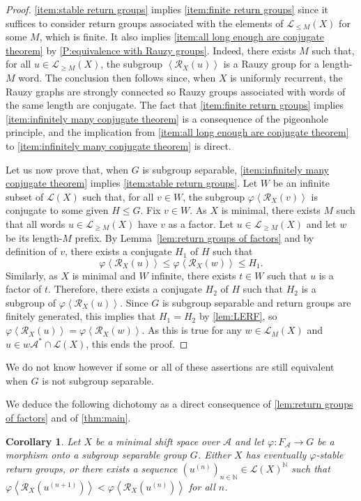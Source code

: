 \documentclass{amsart}
\newcommand*{\N}{\mathbb{N}}
\newcommand*{\ret}{\mathcal{R}}
\newcommand*{\lang}{\mathcal{L}}
\newcommand*{\cA}{\mathcal{A}}
\newcommand*{\from}{\colon}
\newcommand*{\gen}[1]{\left\langle #1\right\rangle}
\theoremstyle{plain}
\newtheorem{corollary}[theorem]{Corollary}
\theoremstyle{definition}
\theoremstyle{remark}
\begin{document}
\begin{proof}
    \cref{item:stable return groups} implies \cref{item:finite return groups} since it suffices to consider return groups associated with the elements of $\lang_{\leq M}(X)$ for some $M$, which is finite. It also implies \cref{item:all long enough are conjugate theorem} by \cref{P:equivalence with Rauzy groups}. Indeed, there exists $M$ such that, for all $u \in \lang_{\geq M}(X)$, the subgroup $\gen{\ret_X(u)}$ is a Rauzy group for a length-$M$ word. The conclusion then follows since, when $X$ is uniformly recurrent, the Rauzy graphs are strongly connected so Rauzy groups associated with words of the same length are conjugate.
    The fact that \cref{item:finite return groups} implies \cref{item:infinitely many conjugate theorem} is a consequence of the pigeonhole principle, and the implication from \cref{item:all long enough are conjugate theorem} to \cref{item:infinitely many conjugate theorem} is direct.

    Let us now prove that, when $G$ is subgroup separable, \cref{item:infinitely many conjugate theorem} implies \cref{item:stable return groups}. Let $W$ be an infinite subset of $\lang(X)$ such that, for all $v \in W$, the subgroup $\varphi\gen{\ret_X(v)}$ is conjugate to some given $H \leq G$. Fix $v \in W$. As $X$ is minimal, there exists $M$ such that all words $u \in \lang_{\geq M}(X)$ have $v$ as a factor. Let $u \in \lang_{\geq M}(X)$ and let $w$ be its length-$M$ prefix. By Lemma~\ref{lem:return groups of factors} and by definition of $v$, there exists a conjugate $H_1$ of $H$ such that
    \[
        \varphi\gen{\ret_X(u)} \leq \varphi\gen{\ret_X(w)} \leq H_1.
    \]
    Similarly, as $X$ is minimal and $W$ infinite, there exists $t \in W$ such that $u$ is a factor of $t$. Therefore, there exists a conjugate $H_2$ of $H$ such that $H_2$ is a subgroup of $\varphi\gen{\ret_X(u)}$. Since $G$ is subgroup separable and return groups are finitely generated, this implies that $H_1 = H_2$ by \cref{lem:LERF}, so $\varphi\gen{\ret_X(u)} = \varphi\gen{\ret_X(w)}$. As this is true for any $w \in \lang_M(X)$ and $u \in w\cA^* \cap \lang(X)$, this ends the proof.    
\end{proof}

We do not know however if some or all of these assertions are still equivalent when $G$ is not subgroup separable.

We deduce the following dichotomy as a direct consequence of \cref{lem:return groups of factors} and of \cref{thm:main}.
\begin{corollary}\label{cor:dualite}
    Let $X$ be a minimal shift space over $\cA$ and let $\varphi\from F_\cA\to G$ be a morphism onto a subgroup separable group $G$. Either $X$ has eventually $\varphi$-stable return groups, or there exists a sequence $\left(u^{(n)}\right)_{n\in\N} \in \lang(X)^\N$ such that $\varphi\gen{\ret_X\left(u^{(n+1)}\right)} < \varphi\gen{\ret_X\left(u^{(n)}\right)}$ for all $n$.
\end{corollary}
\end{document}
